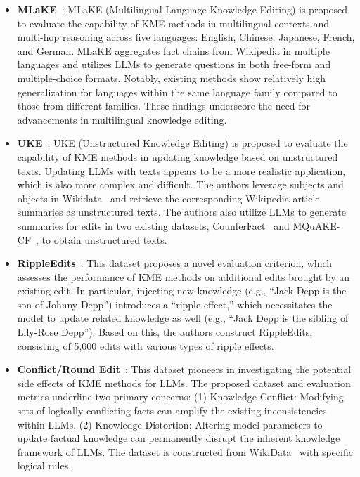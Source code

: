 \documentclass[acmsmall, screen]{acmart}
\begin{document}
\begin{itemize}[leftmargin=0.35cm]
\item\textbf{MLaKE}~\cite{wei2024mlake}: {MLaKE (Multilingual Language Knowledge Editing) is proposed to evaluate the capability of KME methods in multilingual contexts and multi-hop reasoning across five languages: English, Chinese, Japanese, French, and German. MLaKE aggregates fact chains from Wikipedia in multiple languages and utilizes LLMs to generate questions in both free-form and multiple-choice formats. Notably, existing methods show relatively high generalization for languages within the same language family compared to those from different families. These findings underscore the need for advancements in multilingual knowledge editing.
}

\item\textbf{UKE}~\cite{wu2024updating}: { UKE (Unstructured Knowledge Editing) is proposed to evaluate the capability of KME methods in updating knowledge based on unstructured texts. Updating LLMs with texts appears to be a more realistic application, which is also more complex and difficult. The authors leverage subjects and objects in Wikidata~\cite{vrandevcic2014wikidata} and retrieve the corresponding Wikipedia article summaries as unstructured texts. The authors also utilize LLMs to generate summaries for edits in two existing datasets, CounferFact~\cite{meng2022locating} and MQuAKE-CF~\cite{MQuAKE}, to obtain unstructured texts.
}

\item\textbf{RippleEdits}~\cite{cohen2024evaluating}: {This dataset proposes a novel evaluation
criterion, which assesses the performance of KME methods on additional edits brought by an existing edit. In particular, injecting new knowledge (e.g., ``Jack Depp is the son of Johnny Depp'')  introduces a “ripple effect,” which necessitates the model to update related knowledge as well (e.g., ``Jack Depp is the sibling of Lily-Rose Depp''). Based on this, the authors construct RippleEdits, consisting of 5,000 edits with various types of ripple effects.
}
\item\textbf{Conflict/Round Edit}~\cite{li2024unveiling}: {This dataset pioneers in investigating the potential side effects of KME methods for LLMs. The proposed dataset and evaluation metrics underline two primary concerns: (1) Knowledge Conflict: Modifying sets of logically conflicting facts can amplify the existing inconsistencies within LLMs. (2) Knowledge Distortion: Altering model parameters to update factual knowledge can permanently disrupt the inherent knowledge framework of LLMs. The dataset is constructed from WikiData~\cite{vrandevcic2014wikidata} with specific logical rules.
}

\end{itemize}
\end{document}
